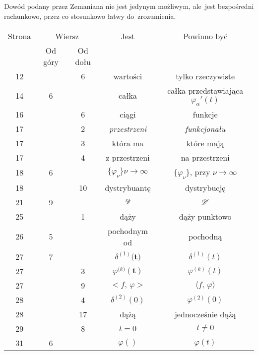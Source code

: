 \documentclass[a4paper,11pt]{article}
\numberwithin{equation}{section}
\begin{document}
Dowód podany przez Zemaniana nie jest jedynym możliwym, ale~jest
bezpośredni rachunkowo, przez co stosunkowo łatwy do~zrozumienia.





\newpage



\begin{center}

  \begin{tabular}{|c|c|c|c|c|}
    \hline
    Strona & \multicolumn{2}{c|}{Wiersz} & Jest
                              & Powinno być \\ \cline{2-3}
    & Od góry & Od dołu & & \\
    \hline
    12  & &  6 & wartości & tylko rzeczywiste \\
    14  &  6 & & całka & całka przedstawiająca $\varphi_{ \alpha }'( t )$ \\
    16  & &  6 & ciągi & funkcje \\
    17  & &  2 & \textit{przestrzeni} & \textit{funkcjonału} \\
    17  & &  3 & która ma & które mają \\
    17  & &  4 & z przestrzeni & na przestrzeni \\
    18  &  6 & & $\{ \varphi_{ \nu } \}\nu \to \infty$
           & $\{ \varphi_{ \nu } \}$, przy $\nu \to \infty$ \\
    18  & & 10 & dystrybuantę & dystrybucję \\
    21  &  9 & & $\mathcal{D}$ & $\mathcal{D}'$ \\
    25  & &  1 & dąży & dąży punktowo \\
    26  &  5 & & pochodnym od & pochodną \\
    27  &  7 & & $\delta^{ ( 1 ) }\boldsymbol{ ( t } )$ & $\delta^{ ( 1 ) }( t )$ \\
    27  & &  3 & $\varphi^{ ( k \boldsymbol{ ) } }\boldsymbol{ ( t ) } $
           & $\varphi^{ ( k ) }( t )$ \\
    27  & &  9 & $< f,\, \varphi >$ & $\langle f, \, \varphi \rangle$ \\
    28  & &  4 & $\delta^{ ( 2 ) }( 0 )$ & $\varphi^{ ( 2 ) }( 0 )$ \\
    28  & & 17 & dążą & jednocześnie dążą \\
    29  & &  8 & $t = 0$ & $t \neq 0$ \\
    31  &  6 & & $\varphi( )$ & $\varphi( t )$ \\

\end{tabular}
\end{center}
\end{document}
